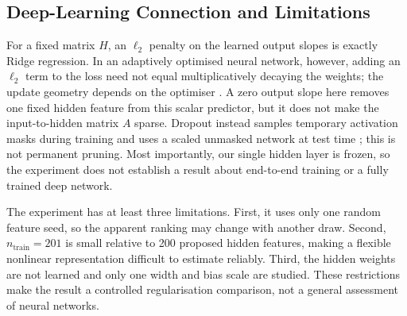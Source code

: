\subsection{Deep-Learning Connection and Limitations}
\label{sec:dl-connection}

For a fixed matrix $H$, an $\ell_2$ penalty on the learned output slopes is
exactly Ridge regression.  In an adaptively optimised neural network, however,
adding an $\ell_2$ term to the loss need not equal multiplicatively decaying the
weights; the update geometry depends on the optimiser
\citep{LoshchilovHutter2019}.  A zero output slope here removes one fixed hidden
feature from this scalar predictor, but it does not make the input-to-hidden
matrix $A$ sparse.  Dropout instead samples temporary activation masks during
training and uses a scaled unmasked network at test time
\citep{Srivastava2014}; this is not permanent pruning.  Most importantly, our
single hidden layer is frozen, so the experiment does not establish a result
about end-to-end training or a fully trained deep network.

The experiment has at least three limitations.  First, it uses only one random
feature seed, so the apparent ranking may change with another draw.  Second,
$n_{\mathrm{train}}=201$ is small relative to 200 proposed hidden features,
making a flexible nonlinear representation difficult to estimate reliably.
Third, the hidden weights are not learned and only one width and bias scale are
studied.  These restrictions make the result a controlled regularisation
comparison, not a general assessment of neural networks.
